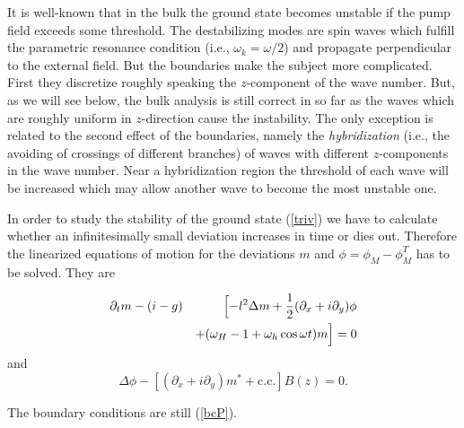It is well-known that in the bulk the ground state becomes unstable
if the pump field exceeds some threshold. The destabilizing modes are
spin waves which fulfill the parametric resonance condition (i.e.,
$\omega_k=\omega/2$) and propagate perpendicular to the external
field\cite{dam.63}.  But the boundaries make the subject more
complicated. First they discretize roughly speaking the
$z$-component of the wave number.  But, as we will see below, the
bulk analysis is still correct in so far as the waves which are
roughly uniform in $z$-direction cause the instability. The only
exception is related to the second effect of the boundaries, namely
the {\em hybridization\/} (i.e., the avoiding of crossings of
different branches) of waves with different
$z$-components in the wave number. Near a hybridization region the
threshold of each wave will be increased which may allow another wave
to become the most unstable one.

In order to study the stability of the ground state (\ref{triv}) 
we have to calculate whether an infinitesimally small deviation
increases in time or dies out. Therefore the linearized equations 
of motion for the deviations $m$ and $\phi=\phi_M-\phi^T_M$ has to be
solved. They are
\begin{mathletters}\label{linEq}
\begin{eqnarray}
  \partial_tm-(i-g)&&\Bigl[-l^2\Delta m+\frac{1}{2}(\partial_x+
   i\partial_y)\phi\nonumber\\ && +(\omega_H-1+\omega_h\cos\omega 
   t)m\Bigr]=0
  \label{linLL}
\end{eqnarray}
and
\begin{equation}
  \Delta\phi-[(\partial_x+i\partial_y)m^*+\mbox{c.c.}]B(z)=0.
  \label{linPoi}
\end{equation}
\end{mathletters}
The boundary conditions are still (\ref{bcP}). 

